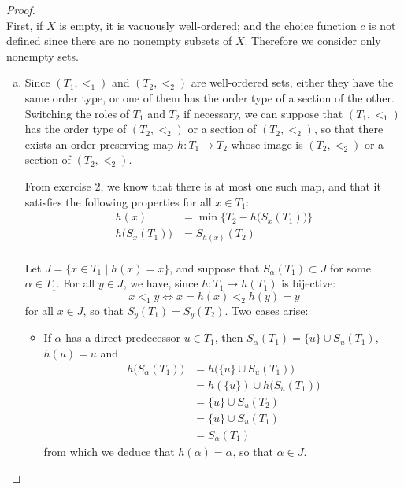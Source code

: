 \documentclass[11pt,a4paper,twoside]{article}
\theoremstyle{definition}
\theoremstyle{plain}
\begin{document}
\begin{proof}\hspace{0pt} \\

  First, if $X$ is empty, it is vacuously well-ordered; and the choice function $c$ is not defined since there
  are no nonempty subsets of $X$. Therefore we consider only nonempty sets.

  \begin{enumerate}[(a)]

  \item\label{point:a} Since $( T_1, <_1 )$ and $( T_2, <_2 )$ are well-ordered sets, either
    they have the same order type, or one of them has the order type of a section of the other.
    Switching the roles of $T_1$ and $T_2$ if necessary, we can suppose that $( T_1, <_1 )$
    has the order type of $( T_2, <_2 )$ or a section of $( T_2, <_2 )$, so that there exists
    an order-preserving map $h \colon T_1 \to T_2$ whose image is $( T_2, <_2 )$ or a section
    of $( T_2, <_2 )$.

    From exercise 2, we know that there is at most one such map, and that it satisfies the following
    properties for all $x \in T_1$:
    \begin{align*}
        h ( x ) &= \min \big\{ T_2 - h \big( S_x ( T_1 ) \big) \big\} \\
        h \big( S_x ( T_1 ) \big) &= S_{ h ( x ) } ( T_2 ) \\
    \end{align*}

    Let $J = \{ x \in T_1 \mid h ( x ) = x \}$, and suppose that $S_\alpha ( T_1 ) \subset J$
    for some $\alpha \in T_1$. For all $y \in J$, we have, since $h \colon T_1 \to h ( T_1 )$ is bijective:
    \begin{equation} \label{ eq:identity }
        x <_1 y \iff x = h ( x ) <_2 h ( y ) = y
    \end{equation}
    for all $x \in J$, so that $S_y ( T_1 ) = S_y ( T_2 )$. Two cases arise:
    \begin{itemize}

    \item If $\alpha$ has a direct predecessor $u \in T_1$, then $S_\alpha ( T_1 ) = \{ u \} \cup S_u ( T_1 )$,
      $h ( u ) = u$ and
      \begin{align*}
        h \big( S_\alpha ( T_1 ) \big) &= h \big( \{ u \} \cup S_u ( T_1 ) \big) \\
        &= h ( \{ u \} ) \cup h \big( S_u ( T_1 ) \big) \\
        &= \{ u \} \cup S_u ( T_2 ) \\
        &= \{ u \} \cup S_u ( T_1 ) \\
        &= S_\alpha ( T_1 )
      \end{align*}
      from which we deduce that $h ( \alpha ) = \alpha$, so that $\alpha \in J$.


\end{itemize}
\end{enumerate}
\end{proof}
\end{document}
